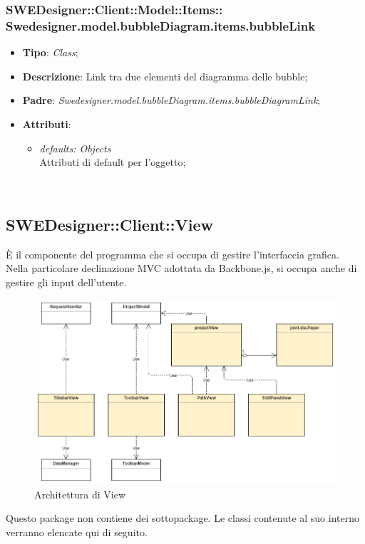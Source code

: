 \documentclass[../DefinizioneDiProdotto.tex]{subfiles}
\begin{document}
			\subsubsection[Swedesigner.model.bubbleDiagram.items.bubbleLink]{SWEDesigner::Client::Model::Items::\\Swedesigner.model.bubbleDiagram.items.bubbleLink}
			\hypertarget{SWEDesigner::Client::Model::Items::Swedesigner.model.bubbleDiagram.items.bubbleLink}{}
			\begin{itemize}
				\item \textbf{Tipo}: \emph{Class};
				\item \textbf{Descrizione}: Link tra due elementi del diagramma delle bubble;
				\item \textbf{Padre}: \emph{Swedesigner.model.bubbleDiagram.items.bubbleDiagramLink};
				\item \textbf{Attributi}:
				\begin{itemize}
					\item \emph{defaults: Objects}\\
					Attributi di default per l'oggetto;
				\end{itemize}\
			\end{itemize}
					
			\subsection{SWEDesigner::Client::View}
				\hypertarget{SWEDesigner::Client::View}{}
				È il componente del programma che si occupa di gestire l'interfaccia grafica. Nella particolare declinazione MVC adottata da Backbone.js, si occupa anche di gestire gli input dell'utente.
					\begin{figure}[H]\label{fig:View}
						\centering
						\includegraphics[scale=0.44]{Immagini/DiagrammaArchitettura/View.png}
						\caption{Architettura di View}
					\end{figure}
				Questo package non contiene dei sottopackage.
				Le classi contenute al suo interno verranno elencate qui di seguito.
\end{document}

